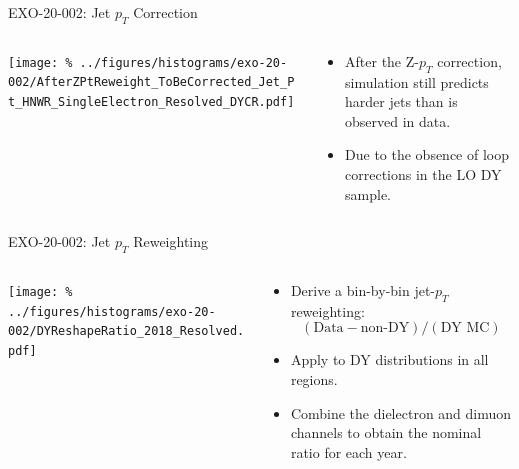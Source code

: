 \documentclass[aspectratio=169]{beamer}
\begin{document}
\begin{frame}{EXO-20-002: Jet $p_T$ Correction}
  \begin{columns}
    \begin{column}{0.45\textwidth}
      \texttt{[image: \%
        ../figures/histograms/exo-20-002/AfterZPtReweight\_ToBeCorrected\_Jet\_Pt\_HNWR\_SingleElectron\_Resolved\_DYCR.pdf]}
    \end{column}
    \begin{column}{0.5\textwidth}
      \begin{block}{}
        \begin{itemize}
          \item After the Z-$p_T$ correction, simulation still predicts harder jets than is observed in data.
          \item Due to the obsence of loop corrections in the LO DY sample.
        \end{itemize}
      \end{block}
    \end{column}
  \end{columns}
\end{frame}

\begin{frame}{EXO-20-002: Jet $p_T$ Reweighting}
  \begin{columns}
    \begin{column}{0.45\textwidth}
      \texttt{[image: \%
        ../figures/histograms/exo-20-002/DYReshapeRatio\_2018\_Resolved.pdf]}
    \end{column}
    \begin{column}{0.5\textwidth}
      \begin{block}{}
        \begin{itemize}
          \item Derive a bin-by-bin jet-$p_T$ reweighting: $$(\text{Data} - \text{non-DY})/(\text{DY MC})$$
          \item Apply to DY distributions in all regions.
          \item Combine the dielectron and dimuon channels to obtain the nominal ratio for each year.
        \end{itemize}
      \end{block}
    \end{column}
  \end{columns}
\end{frame}
\end{document}
